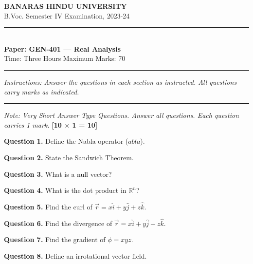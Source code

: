 \documentclass[11pt,a4paper]{article}
\begin{document}
\begin{center}
  {\large\bfseries BANARAS HINDU UNIVERSITY}\\[2pt]
  {\normalsize B.Voc. Semester IV Examination, 2023-24}\\[6pt]
  \rule{0.8\linewidth}{0.5pt}\\[6pt]
  {\large\bfseries Paper: GEN-401 --- Real Analysis}\\[4pt]
  {\normalsize Time: Three Hours \hfill Maximum Marks: 70}
\end{center}

\rule{\linewidth}{0.4pt}

\smallskip



\noindent   \textit{Instructions: Answer the questions in each section as instructed. All questions carry marks as indicated.}

\bigskip

\bigskip


\rule{\linewidth}{0.4pt}\smallskip




\noindent   \textit{Note: Very Short Answer Type Questions. Answer all questions. Each question carries 1 mark.} \hfill   \textbf{[10 $ \times$ 1 = 10]}

\medskip


\noindent   \textbf{Question 1.} Define the Nabla operator ($
abla$).

\medskip


\noindent   \textbf{Question 2.} State the Sandwich Theorem.

\medskip


\noindent   \textbf{Question 3.} What is a null vector?

\medskip


\noindent   \textbf{Question 4.} What is the dot product in $\mathbb{R}^n$?

\medskip


\noindent   \textbf{Question 5.} Find the curl of $\vec{r} = x\hat{i} + y\hat{j} + z\hat{k}$.

\medskip


\noindent   \textbf{Question 6.} Find the divergence of $\vec{r} = x\hat{i} + y\hat{j} + z\hat{k}$.

\medskip


\noindent   \textbf{Question 7.} Find the gradient of $\phi = xyz$.

\medskip


\noindent   \textbf{Question 8.} Define an irrotational vector field.
\end{document}
